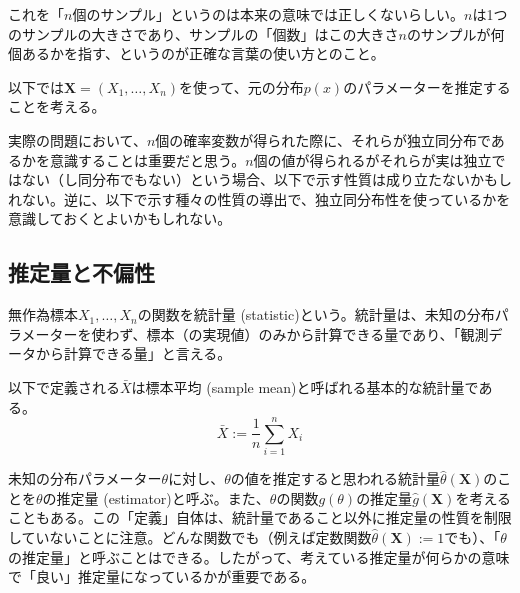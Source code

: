 \documentclass[uplatex,dvipdfmx]{jlreq}
\newcommand\term[1]{\textsf{#1}}
\begin{document}
\begin{note}
    これを「$n$個のサンプル」というのは本来の意味では正しくないらしい。$n$は1つのサンプルの大きさであり、サンプルの「個数」はこの大きさ$n$のサンプルが何個あるかを指す、というのが正確な言葉の使い方とのこと。
\end{note}

以下では$\boldsymbol{X}=(X_1, \dotsc, X_n)$を使って、元の分布$p(x)$のパラメーターを推定することを考える。

\begin{note}
    実際の問題において、$n$個の確率変数が得られた際に、それらが独立同分布であるかを意識することは重要だと思う。$n$個の値が得られるがそれらが実は独立ではない（し同分布でもない）という場合、以下で示す性質は成り立たないかもしれない。逆に、以下で示す種々の性質の導出で、独立同分布性を使っているかを意識しておくとよいかもしれない。
\end{note}

\subsection{推定量と不偏性}

無作為標本$X_1, \dotsc, X_n$の関数を\term{統計量 (statistic)}という。統計量は、未知の分布パラメーターを使わず、標本（の実現値）のみから計算できる量であり、「観測データから計算できる量」と言える。

\begin{example}[標本平均]
    以下で定義される$\bar{X}$は\term{標本平均 (sample mean)}と呼ばれる基本的な統計量である。
    \begin{equation}
        \bar{X} := \frac{1}{n} \sum_{i=1}^n X_i
    \end{equation}
\end{example}

未知の分布パラメーター$\theta$に対し、$\theta$の値を推定すると思われる統計量$\hat{\theta}(\boldsymbol{X})$のことを$\theta$の\term{推定量 (estimator)}と呼ぶ。また、$\theta$の関数$g(\theta)$の推定量$\hat{g}(\boldsymbol{X})$を考えることもある。この「定義」自体は、統計量であること以外に推定量の性質を制限していないことに注意。どんな関数でも（例えば定数関数$\hat{\theta}(\boldsymbol{X}):=1$でも）、「$\theta$の推定量」と呼ぶことはできる。したがって、考えている推定量が何らかの意味で「良い」推定量になっているかが重要である。
\end{document}
